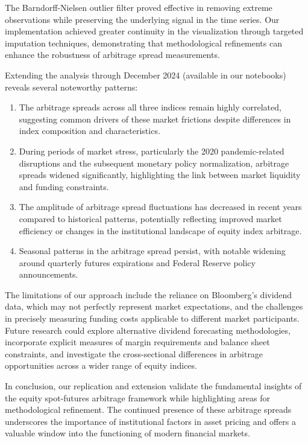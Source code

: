 \documentclass{article}
\begin{document}
The Barndorff-Nielsen outlier filter proved effective in removing extreme observations while preserving the underlying signal in the time series. Our implementation achieved greater continuity in the visualization through targeted imputation techniques, demonstrating that methodological refinements can enhance the robustness of arbitrage spread measurements.

Extending the analysis through December 2024 (available in our notebooks) reveals several noteworthy patterns:

\begin{enumerate}
    \item The arbitrage spreads across all three indices remain highly correlated, suggesting common drivers of these market frictions despite differences in index composition and characteristics.
    
    \item During periods of market stress, particularly the 2020 pandemic-related disruptions and the subsequent monetary policy normalization, arbitrage spreads widened significantly, highlighting the link between market liquidity and funding constraints.
    
    \item The amplitude of arbitrage spread fluctuations has decreased in recent years compared to historical patterns, potentially reflecting improved market efficiency or changes in the institutional landscape of equity index arbitrage.
    
    \item Seasonal patterns in the arbitrage spread persist, with notable widening around quarterly futures expirations and Federal Reserve policy announcements.

  \end{enumerate}


The limitations of our approach include the reliance on Bloomberg's dividend data, which may not perfectly represent market expectations, and the challenges in precisely measuring funding costs applicable to different market participants. Future research could explore alternative dividend forecasting methodologies, incorporate explicit measures of margin requirements and balance sheet constraints, and investigate the cross-sectional differences in arbitrage opportunities across a wider range of equity indices.

In conclusion, our replication and extension validate the fundamental insights of the equity spot-futures arbitrage framework while highlighting areas for methodological refinement. The continued presence of these arbitrage spreads underscores the importance of institutional factors in asset pricing and offers a valuable window into the functioning of modern financial markets.
\end{document}
